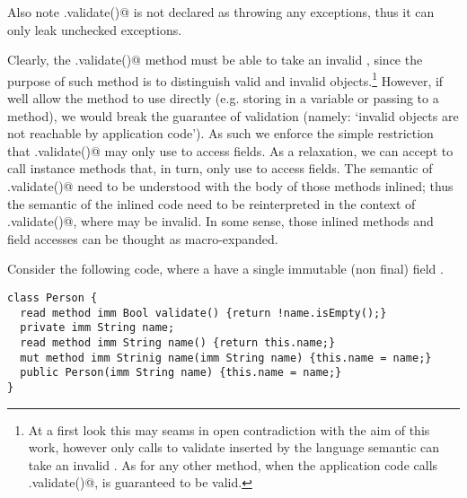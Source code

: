 \noindent Also note \Q@.validate()@ is not declared as throwing any exceptions, thus it can only leak unchecked exceptions.


Clearly, the \Q@.validate()@ method must be able to take an invalid \Q@this@, since the purpose of such method is to distinguish valid and invalid objects.\footnote{
At a first look this may seams in open contradiction
with the aim of this work, however only calls to validate inserted by the language semantic can take an invalid \Q@this@. As for any other method, when the application code calls \Q@.validate()@,
\Q@this@ is guaranteed to be valid.
}%
However, if well allow the method to use \Q@this@ directly (e.g. storing in a variable or passing to a method), we would break the guarantee of validation (namely: `invalid objects are not reachable by application code'). As such we enforce the simple restriction that \Q@.validate()@ may only use \Q@this@ to access fields.
As a relaxation, we can accept to call instance methods that, in turn, only use \Q@this@ to access fields.
The semantic of \Q@.validate()@ need to be understood with the body of those methods inlined; thus the semantic of the inlined code need to be reinterpreted in the context of \Q@.validate()@, where \Q@this@ may be invalid.
In some sense, those inlined methods and field accesses can be thought as macro-expanded.



%
\loseSpace
Consider the following code, where a \Q@Person@ have a single immutable (non final) field \Q@name@.
\begin{lstlisting}
class Person {
  read method imm Bool validate() {return !name.isEmpty();}
  private imm String name;
  read method imm String name() {return this.name;}
  mut method imm Strinig name(imm String name) {this.name = name;}
  public Person(imm String name) {this.name = name;}
}
\end{lstlisting}

